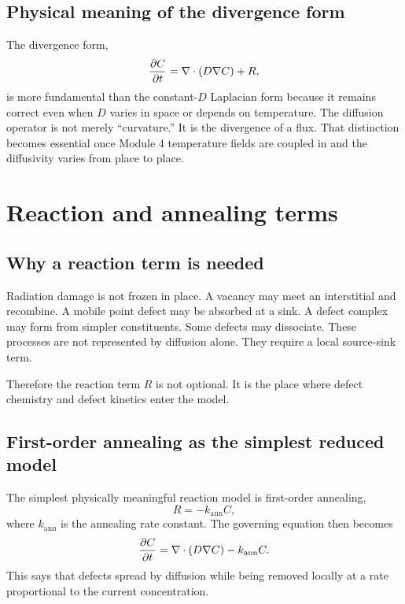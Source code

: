 \documentclass[11pt]{article}
\begin{document}
\subsection{Physical meaning of the divergence form}

The divergence form,
\begin{equation}
\pdv{C}{t} = \nabla \cdot (D \nabla C) + R,
\end{equation}
is more fundamental than the constant-$D$ Laplacian form because it remains correct even when $D$ varies in space or depends on temperature. The diffusion operator is not merely ``curvature.'' It is the divergence of a flux. That distinction becomes essential once Module 4 temperature fields are coupled in and the diffusivity varies from place to place.

\section{Reaction and annealing terms}

\subsection{Why a reaction term is needed}

Radiation damage is not frozen in place. A vacancy may meet an interstitial and recombine. A mobile point defect may be absorbed at a sink. A defect complex may form from simpler constituents. Some defects may dissociate. These processes are not represented by diffusion alone. They require a local source-sink term.

Therefore the reaction term $R$ is not optional. It is the place where defect chemistry and defect kinetics enter the model.

\subsection{First-order annealing as the simplest reduced model}

The simplest physically meaningful reaction model is first-order annealing,
\begin{equation}
R = -k_{\mathrm{ann}} C,
\end{equation}
where $k_{\mathrm{ann}}$ is the annealing rate constant. The governing equation then becomes
\begin{equation}
\pdv{C}{t} = \nabla \cdot (D \nabla C) - k_{\mathrm{ann}} C.
\end{equation}
This says that defects spread by diffusion while being removed locally at a rate proportional to the current concentration.
\end{document}
